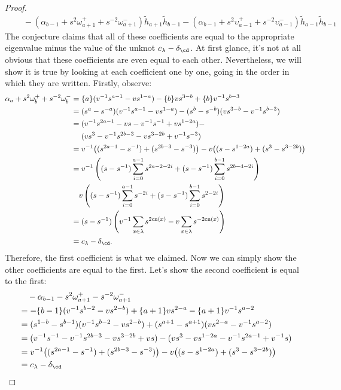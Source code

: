 \begin{proof}
\begin{align*}
&\quad - (\alpha_{b-1} + s^{2} \omega_{a+1}^+ + s^{-2} \omega_{a+1}^-) \tilde{h}_{a+1} \tilde{h}_{b-1} - (\alpha_{b-1} + s^2 \upsilon_{a-1}^+ + s^{-2} \upsilon_{a-1}^-) \tilde{h}_{a-1} \tilde{h}_{b-1} 
\end{align*}
The conjecture claims that all of these coefficients are equal to the appropriate eigenvalue minus the value of the unknot $c_\lambda - \delta_\cd$. At first glance, it's not at all obvious that these coefficients are even equal to each other. Nevertheless, we will show it is true by looking at each coefficient one by one, going in the order in which they are written. Firstly, observe:
\begin{align*}
\alpha_a + s^2 \omega_b^+ + s^{-2}\omega_b^- &= \{a\} (v^{-1}s^{a-1} - v s^{1-a} ) - \{b\}vs^{3-b} + \{b\}v^{-1}s^{b-3} \\
&= (s^a - s^{-a}) (v^{-1}s^{a-1} - v s^{1-a} ) -  (s^b - s^{-b})(vs^{3-b} - v^{-1}s^{b-3}) \\
&= (v^{-1} s^{2a-1} - vs - v^{-1}s^{-1} + vs^{1-2a}) - \\
& \quad\,\, (vs^3 - v^{-1}s^{2b-3} - vs^{3-2b} + v^{-1}s^{-3}) \\
&= v^{-1} \big( (s^{2a-1} - s^{-1}) + (s^{2b-3} - s^{-3}) \big) - v \big( ( s - s^{1-2a}) + (s^3 - s^{3-2b}) \big) \\
&= v^{-1} \left( (s-s^{-1}) \sum_{i=0}^{a-1} s^{2a - 2 - 2i} + (s-s^{-1}) \sum_{i=0}^{b-1} s^{2b-4-2i} \right) \\
&\quad v \left( (s-s^{-1}) \sum_{i=0}^{a-1} s^{-2i} + (s-s^{-1}) \sum_{i=0}^{b-1} s^{2-2i} \right) \\
&= (s-s^{-1}) \left( v^{-1} \sum_{x \in \lambda} s^{2 \cn(x)} - v \sum_{x \in \lambda} s^{-2\cn(x)} \right) \\
&= c_\lambda - \delta_\cd.
\end{align*}
Therefore, the first coefficient is what we claimed. Now we can simply show the other coefficients are equal to the first. Let's show the second coefficient is equal to the first:
\begin{align*}
&\quad-\alpha_{b-1} - s^2 \omega_{a+1}^+ - s^{-2} \omega_{a+1}^- \\
&= -\{b-1\}(v^{-1}s^{b-2}-vs^{2-b}) + \{a+1\}vs^{2-a} - \{a+1\}v^{-1}s^{a-2} \\
&= (s^{1-b} - s^{b-1} ) (v^{-1}s^{b-2} - vs^{2-b}) + (s^{a+1}-s^{a+1})(vs^{2-a} - v^{-1}s^{a-2}) \\
&= (v^{-1}s^{-1} - v^{-1}s^{2b-3} - vs^{3-2b} + vs) - (vs^3 - vs^{1-2a} - v^{-1}s^{2a-1} + v^{-1}s) \\
&= v^{-1} \big( (s^{2a-1} - s^{-1}) + (s^{2b-3} - s^{-3}) \big) - v \big( ( s - s^{1-2a}) + (s^3 - s^{3-2b}) \big) \\
&= c_\lambda - \delta_\cd
\end{align*}


\end{proof}
